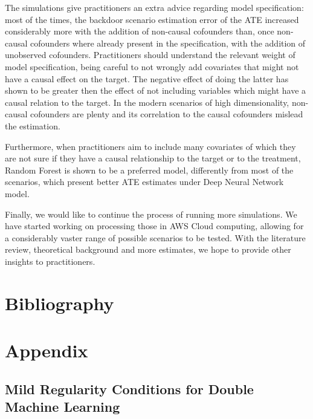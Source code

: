 \documentclass{article}
\numberwithin{equation}{section}
\begin{document}
The simulations give practitioners an extra advice regarding model specification: most of the times, the backdoor scenario estimation error of the ATE increased considerably more with the addition of non-causal cofounders than, once non-causal cofounders where already present in the specification, with the addition of unobserved cofounders. Practitioners should understand the relevant weight of model specification, being careful to not wrongly add covariates that might not have a causal effect on the target. The negative effect of doing the latter has shown to be greater then the effect of not including variables which might have a causal relation to the target. In the modern scenarios of high dimensionality, non-causal cofounders are plenty and its correlation to the causal cofounders mislead the estimation. 

Furthermore, when practitioners aim to include many covariates of which they are not sure if they have a causal relationship to the target or to the treatment, Random Forest is shown to be a preferred model, differently from most of the scenarios, which present better ATE estimates under Deep Neural Network model.

Finally, we would like to continue the process of running more simulations. We have started working on processing those in AWS Cloud computing, allowing for a considerably vaster range of possible scenarios to be tested. With the literature review, theoretical background and more estimates, we hope to provide other insights to practitioners.

\newpage

\section{Bibliography}



\newpage

\section{Appendix}

\subsection{Mild Regularity Conditions for Double Machine Learning}
\label{subsec:appendix_mild_regularity_conditions_for_dml}
\end{document}
